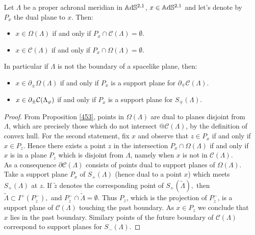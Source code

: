 \begin{proposition}\label{464}
Let $\Lambda$ be a proper achronal meridian in $\mathbb{A}\mathrm{d}\mathbb{S}^{2,1}$, $x\in\mathbb{A}\mathrm{d}\mathbb{S}^{2,1}$ and let's denote by $P_x$ the dual plane to $x$. Then: 
\begin{itemize}
    \item $x\in\Omega(\Lambda)$ if and only if $P_x\cap\mathcal{C}(\Lambda)=\emptyset$. 
    \item $x\in\mathcal{C}(\Lambda)$ if and only if $P_x\cap \Omega(\Lambda)=\emptyset$.
\end{itemize} 
In particular if $\Lambda$ is not the boundary of a spacelike plane, then: 
\begin{itemize}
    \item $x\in\partial_\pm\Omega(\Lambda)$ if and only if $P_x$ is a support plane for $\partial_\mp\mathcal{C}(\Lambda).$
    \item $x\in\partial_\pm\mathcal{C}(\Lambda_\varphi)$ if and only if $P_x$ is a support plane for $S_\mp(\Lambda)$.
\end{itemize}
\end{proposition}
\begin{proof}
From Proposition \ref{453}, points in $\Omega(\Lambda)$ are dual to planes disjoint from $\Lambda$, which are precisely those which do not intersect $@\mathcal{C}(\Lambda)$, by the definition of convex hull. For the second statement, fix $x$ and observe that $z\in P_x$ if and only if $x\in P_z$. Hence there exists a point $z$ in the intersection $P_x\cap \Omega(\Lambda)$ if and only if $x$ is in a plane $P_z$ which is disjoint from $\Lambda$, namely when $x$ is not in $\mathcal{C}(\Lambda)$. \\
As a consequence $\partial\mathcal{C}(\Lambda)$ consists of points dual to support planes of $\Omega(\Lambda)$. Take a support plane $P_x$ of $S_+(\Lambda)$ (hence dual to a point $x$) which meets $S_+(\Lambda)$ at $z$. If $\widetilde{z}$ denotes the corresponding point of $S_+(\widetilde{\Lambda}),$ then $\widetilde{\Lambda}\subset I^+(P_{\widetilde{z}}^-),$ and $P_{\widetilde{z}}^-\cap\widetilde{\Lambda}=\emptyset.$ Thus $P_z$, which is the projection of $P_{\widetilde{z}}^-$, is a support plane of $\mathcal{C}(\Lambda)$ touching the past boundary. As $x\in P_z$ we conclude that $x$ lies in the past boundary. Similary points of the future boundary of $\mathcal{C}(\Lambda)$ correspond to support planes for $S_-(\Lambda)$.
\end{proof}

